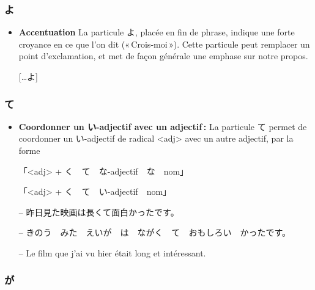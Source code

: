         \subsubsection{よ}

    \begin{itemize}
        \item \textbf{Accentuation} La particule よ, placée en fin de phrase, indique une forte croyance en ce que l'on dit (« Crois-moi »). Cette particule peut remplacer un point d'exclamation, et met de façon générale une emphase sur notre propos.
        \begin{center}
            [\ldots よ]
        \end{center}
    \end{itemize}

        \subsubsection{て}

    \begin{itemize}
        \item \textbf{Coordonner un い-adjectif avec un adjectif :} La particule て permet de coordonner un い-adjectif de radical <adj> avec un autre adjectif, par la forme
    
        \begin{center}
            「<adj> + く　て　な-adjectif　な　nom」

            「<adj> + く　て　い-adjectif　nom」
        \end{center}

        \begin{tcolorbox}
            -- 昨日見た映画は長くて面白かったです。

            -- きのう　みた　えいが　は　ながく　て　おもしろい　かったです。

            -- Le film que j'ai vu hier était long et intéressant.
        \end{tcolorbox}
    \end{itemize}

        \subsubsection{が}

